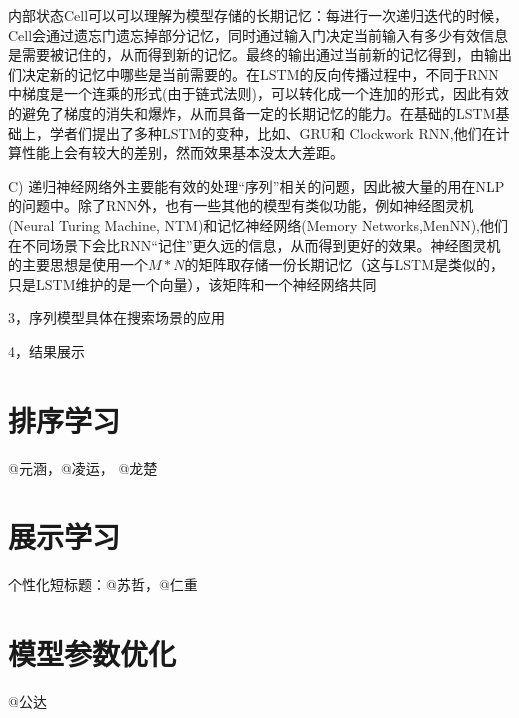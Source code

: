 内部状态Cell可以可以理解为模型存储的长期记忆：每进行一次递归迭代的时候，Cell会通过遗忘门遗忘掉部分记忆，同时通过输入门决定当前输入有多少有效信息是需要被记住的，从而得到新的记忆。最终的输出通过当前新的记忆得到，由输出们决定新的记忆中哪些是当前需要的。在LSTM的反向传播过程中，不同于RNN中梯度是一个连乘的形式(由于链式法则)，可以转化成一个连加的形式，因此有效的避免了梯度的消失和爆炸，从而具备一定的长期记忆的能力。在基础的LSTM基础上，学者们提出了多种LSTM的变种，比如\cite{10}、GRU\cite{11}和 Clockwork RNN\cite{12},他们在计算性能上会有较大的差别，然而效果基本没太大差距\cite{13,14}。

C) 递归神经网络外主要能有效的处理“序列”相关的问题，因此被大量的用在NLP的问题中。除了RNN外，也有一些其他的模型有类似功能，例如神经图灵机(Neural Turing Machine, NTM\cite{7})和记忆神经网络(Memory Networks,MenNN\cite{8,9}),他们在不同场景下会比RNN“记住”更久远的信息，从而得到更好的效果。神经图灵机的主要思想是使用一个$M*N$的矩阵取存储一份长期记忆（这与LSTM是类似的，只是LSTM维护的是一个向量），该矩阵和一个神经网络共同

3，序列模型具体在搜索场景的应用

4，结果展示
	
\section{排序学习}
	@元涵，@凌运， @龙楚
\subsection{}

\section{展示学习}
	个性化短标题：@苏哲，@仁重 

\section{模型参数优化} 
	@公达

